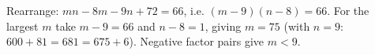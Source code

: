 Rearrange: $mn-8m-9n+72=66$, i.e. $(m-9)(n-8)=66$. For the largest $m$ take $m-9=66$ and $n-8=1$, giving $m=\boxed{75}$ (with $n=9$: $600+81=681=675+6$). Negative factor pairs give $m<9$.
